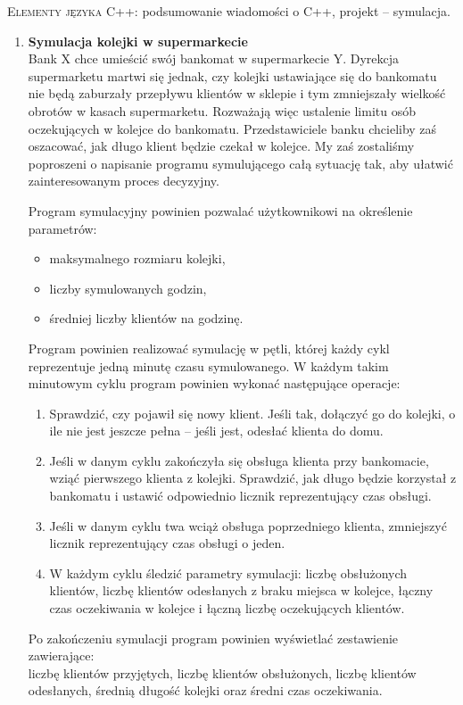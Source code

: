 \documentclass[12pt]{article}
\begin{document}
\small \textsc{Elementy języka C++:} podsumowanie wiadomości o C++, projekt -- symulacja.

\begin{enumerate}

\item \textbf{Symulacja kolejki w supermarkecie}\\
Bank X chce umieścić swój bankomat w supermarkecie Y. Dyrekcja
supermarketu martwi się jednak, czy kolejki ustawiające się do bankomatu nie będą zaburzały
przepływu klientów w sklepie i tym zmniejszały wielkość obrotów w kasach supermarketu.
Rozważają więc ustalenie limitu osób oczekujących w kolejce do bankomatu. Przedstawiciele
banku chcieliby zaś oszacować, jak długo klient będzie czekał w kolejce. My zaś zostaliśmy
poproszeni o napisanie programu symulującego całą sytuację tak, aby ułatwić zainteresowanym proces decyzyjny.

\vspace{0.1cm}
Program symulacyjny powinien pozwalać użytkownikowi na określenie parametrów:
\begin{itemize}
\item \textsf{maksymalnego rozmiaru kolejki},
\item \textsf{liczby symulowanych godzin},
\item \textsf{średniej liczby klientów na godzinę}.
\end{itemize}
Program powinien realizować symulację w pętli, której każdy cykl
reprezentuje jedną minutę czasu symulowanego. W każdym takim minutowym cyklu program
powinien wykonać następujące operacje:
\begin{enumerate}
\item Sprawdzić, czy pojawił się nowy klient. Jeśli tak, dołączyć go do kolejki, o ile nie jest
jeszcze pełna -- jeśli jest, odesłać klienta do domu.
\item Jeśli w danym cyklu zakończyła się obsługa klienta przy bankomacie, wziąć pierwszego
klienta z kolejki. Sprawdzić, jak długo będzie korzystał z bankomatu i ustawić odpowiednio
licznik reprezentujący czas obsługi.
\item Jeśli w danym cyklu twa wciąż obsługa poprzedniego klienta, zmniejszyć licznik reprezentujący czas obsługi
o jeden.
\item W każdym cyklu śledzić parametry symulacji: liczbę obsłużonych klientów, liczbę klientów
odesłanych z braku miejsca w kolejce, łączny czas oczekiwania w kolejce i łączną liczbę
oczekujących klientów.
\end{enumerate}
Po zakończeniu symulacji program powinien wyświetlać zestawienie zawierające:\\
\textsf{liczbę klientów przyjętych},
\textsf{liczbę klientów obsłużonych},
\textsf{liczbę klientów odesłanych},
\textsf{średnią długość kolejki} oraz
\textsf{średni czas oczekiwania}.


\end{enumerate}
\end{document}
